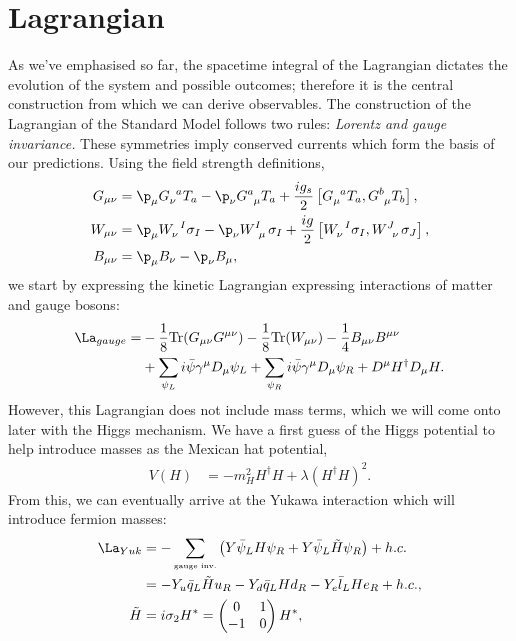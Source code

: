 \documentclass[a4paper, 11pt, normalem]{report}
\begin{document}
\section{Lagrangian}
As we've emphasised so far, the spacetime integral of the Lagrangian dictates the evolution of the system and possible outcomes; therefore it is the central construction from which we can derive observables.
The construction of the Lagrangian of the Standard Model follows two rules: \emph{Lorentz and gauge invariance.}
These symmetries imply conserved currents which form the basis of our predictions.
Using the field strength definitions,
\begin{align}
    G_{\mu\nu} &= \p_\mu \tensor{G}{_\nu^a}T_a - \p_\nu\tensor{G}{^a_\mu}T_a + \frac{ig_s}{2}\left[\tensor{G}{_\mu^a}T_a,\tensor{G}{^b_\mu}T_b\right], \\
    W_{\mu\nu} &= \p_\mu \tensor{W}{_\nu^I}\sigma_I - \p_\nu\tensor{W}{^I_\mu}\sigma_I + \frac{ig}{2}\left[\tensor{W}{_\nu^I}\sigma_I,\tensor{W}{^J_\nu}\sigma_J\right], \\
    B_{\mu\nu} &= \p_\mu B_\nu - \p_\nu B_\mu,
\end{align}
we start by expressing the kinetic Lagrangian expressing interactions of matter and gauge bosons:
\begin{align}
    \begin{split}
        \La_{gauge} = &-\frac18\text{Tr}(G_{\mu\nu}G^{\mu\nu})-\frac18\text{Tr}(W_{\mu\nu}) - \frac14B_{\mu\nu}B^{\mu\nu} \\
                      &+ \sum_{\psi_L} i\bar{\psi}\gamma^\mu D_\mu\psi_L + \sum_{\psi_R}i\bar{\psi}\gamma^\mu D_\mu \psi_R + D^\mu H^\dagger D_\mu H.
    \end{split}
\end{align}
However, this Lagrangian does not include mass terms, which we will come onto later with the Higgs mechanism.
We have a first guess of the Higgs potential to help introduce masses as the Mexican hat potential,
\begin{align}
    V(H) &= -m_H^2H^\dagger H + \lambda(H^\dagger H)^2.
\end{align}
From this, we can eventually arrive at the Yukawa interaction which will introduce fermion masses:
\begin{align}
    \La_{Yuk} &= -\sum_{\text{\tiny gauge inv.}} \left(Y\bar{\psi}_L H\psi_R + Y\bar{\psi}_L\tilde{H}\psi_R\right) + h.c. \\
              &= -Y_u\bar{q}_L\tilde{H}u_R - Y_d\bar{q}_L Hd_R - Y_e\bar{l}_L He_R + h.c., \\
    \tilde{H} &= i\sigma_2 H^* = \begin{pmatrix} 0 & 1 \\ -1 & 0 \end{pmatrix}H^*,
\end{align}
\end{document}

